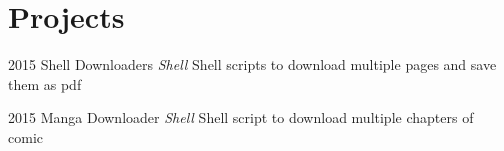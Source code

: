 \documentclass[]{friggeri-cv-a4}
\begin{document}

\section{\normalfont Projects}

\begin{entrylist}

\entry
{2015}
{Shell Downloaders}
{\emph{Shell}}
{Shell scripts to download multiple pages and save them as pdf}

\entry
{2015}
{Manga Downloader}
{\emph{Shell}}
{Shell script to download multiple chapters of comic}

\end{entrylist}
\end{document}
